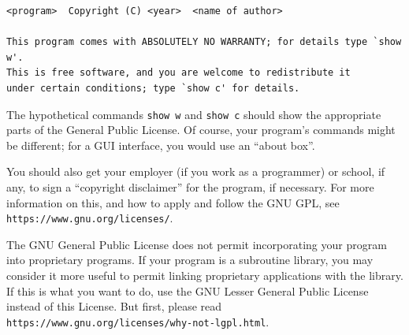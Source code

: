 \documentclass[11pt]{article}
\begin{document}
\begin{enumerate}
{\footnotesize
\begin{verbatim}
<program>  Copyright (C) <year>  <name of author>

This program comes with ABSOLUTELY NO WARRANTY; for details type `show w'.
This is free software, and you are welcome to redistribute it
under certain conditions; type `show c' for details.
\end{verbatim}
}

The hypothetical commands {\tt show w} and {\tt show c} should show
the appropriate
parts of the General Public License.  Of course, your program's commands
might be different; for a GUI interface, you would use an ``about box''.

You should also get your employer (if you work as a programmer) or
school, if any, to sign a ``copyright disclaimer'' for the program, if
necessary.  For more information on this, and how to apply and follow
the GNU GPL, see \texttt{https://www.gnu.org/licenses/}.

The GNU General Public License does not permit incorporating your
program into proprietary programs.  If your program is a subroutine
library, you may consider it more useful to permit linking proprietary
applications with the library.  If this is what you want to do, use
the GNU Lesser General Public License instead of this License.  But
first, please read \texttt{https://www.gnu.org/licenses/why-not-lgpl.html}.

\end{enumerate}
\end{document}
